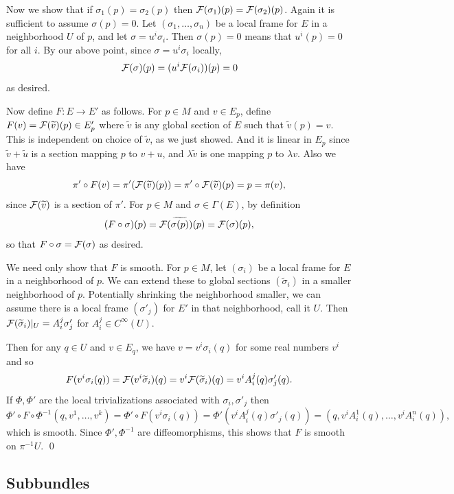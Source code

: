     Now we show that if $\sigma_1(p)=\sigma_2(p)$ then ${\cal F}(\sigma_1)(p)={\cal F}(\sigma_2)(p)$.
    Again it is sufficient to assume $\sigma(p)=0$.
    Let $(\sigma_1,\dots,\sigma_n)$ be a local frame for $E$ in a neighborhood $U$ of $p$, and let $\sigma=u^i\sigma_i$.
    Then $\sigma(p)=0$ means that $u^i(p)=0$ for all $i$.
    By our above point, since $\sigma=u^i\sigma_i$ locally,
    $$ {\cal F}(\sigma)(p) = (u^i{\cal F}(\sigma_i))(p) = 0 $$
    as desired.

    Now define $F\colon E\to E'$ as follows.
    For $p\in M$ and $v\in E_p$, define $F(v)={\cal F}(\widetilde v)(p)\in E'_p$ where $\tilde v$ is any global section of $E$ such that $\tilde v(p)=v$.
    This is independent on choice of $\tilde v$, as we just showed.
    And it is linear in $E_p$ since $\tilde v+\tilde u$ is a section mapping $p$ to $v+u$, and $\lambda\tilde v$ is one mapping $p$ to $\lambda v$.
    Also we have
    $$ \pi'\circ F(v) = \pi'({\cal F}(\widetilde v)(p)) = \pi'\circ{\cal F}(\widetilde v)(p) = p = \pi(v) , $$
    since ${\cal F}(\widetilde v)$ is a section of $\pi'$.
    For $p\in M$ and $\sigma\in\Gamma(E)$, by definition
    $$ (F\circ\sigma)(p) = {\cal F}(\widetilde{\sigma(p)})(p) = {\cal F}(\sigma)(p) , $$
    so that $F\circ\sigma={\cal F}(\sigma)$ as desired.

    We need only show that $F$ is smooth.
    For $p\in M$, let $(\sigma_i)$ be a local frame for $E$ in a neighborhood of $p$.
    We can extend these to global sections $(\tilde\sigma_i)$ in a smaller neighborhood of $p$.
    Potentially shrinking the neighborhood smaller, we can assume there is a local frame $(\sigma'_j)$ for $E'$ in that neighborhood, call it $U$.
    Then ${\cal F}(\widetilde\sigma_i)|_U=A^j_i\sigma'_j$ for $A^j_i\in C^\infty(U)$.

    Then for any $q\in U$ and $v\in E_q$, we have $v=v^i\sigma_i(q)$ for some real numbers $v^i$ and so
    $$ F(v^i\sigma_i(q)) = {\cal F}(v^i\widetilde\sigma_i)(q) = v^i{\cal F}(\widetilde\sigma_i)(q) = v^iA^j_i(q)\sigma'_j(q) . $$
    If $\Phi,\Phi'$ are the local trivializations associated with $\sigma_i,\sigma'_j$ then
    $$ \Phi'\circ F\circ\Phi^{-1}(q,v^1,\dots,v^k) = \Phi'\circ F(v^i\sigma_i(q)) = \Phi'(v^iA^j_i(q)\sigma'_j(q)) = (q,v^iA^1_i(q),\dots,v^iA^n_i(q)) , $$
    which is smooth.
    Since $\Phi',\Phi^{-1}$ are diffeomorphisms, this shows that $F$ is smooth on $\pi^{-1}U$.
    \qed

\eproof

\subsection{Subbundles}

